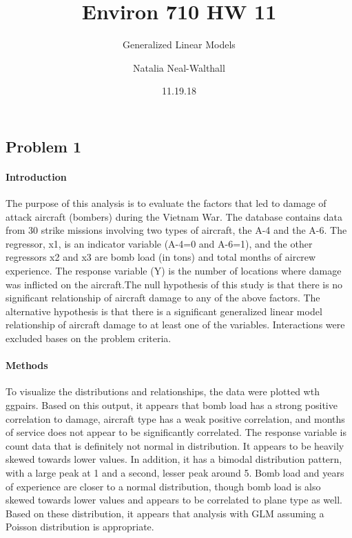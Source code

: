 \documentclass[]{article}
\title{Environ 710 HW 11}
\subtitle{Generalized Linear Models}
\author{Natalia Neal-Walthall}
\date{11.19.18}
\let\oldparagraph\paragraph
\renewcommand{\paragraph}[1]{\oldparagraph{#1}\mbox{}}
\begin{document}
\maketitle

\subsection{Problem 1}\label{problem-1}

\paragraph{Introduction}\label{introduction}

The purpose of this analysis is to evaluate the factors that led to
damage of attack aircraft (bombers) during the Vietnam War. The database
contains data from 30 strike missions involving two types of aircraft,
the A-4 and the A-6. The regressor, x1, is an indicator variable (A-4=0
and A-6=1), and the other regressors x2 and x3 are bomb load (in tons)
and total months of aircrew experience. The response variable (Y) is the
number of locations where damage was inflicted on the aircraft.The null
hypothesis of this study is that there is no significant relationship of
aircraft damage to any of the above factors. The alternative hypothesis
is that there is a significant generalized linear model relationship of
aircraft damage to at least one of the variables. Interactions were
excluded bases on the problem criteria.

\paragraph{Methods}\label{methods}

To visualize the distributions and relationships, the data were plotted
wth ggpairs. Based on this output, it appears that bomb load has a
strong positive correlation to damage, aircraft type has a weak positive
correlation, and months of service does not appear to be significantly
correlated. The response variable is count data that is definitely not
normal in distribution. It appears to be heavily skewed towards lower
values. In addition, it has a bimodal distribution pattern, with a large
peak at 1 and a second, lesser peak around 5. Bomb load and years of
experience are closer to a normal distribution, though bomb load is also
skewed towards lower values and appears to be correlated to plane type
as well. Based on these distribution, it appears that analysis with GLM
assuming a Poisson distribution is appropriate.
\end{document}
